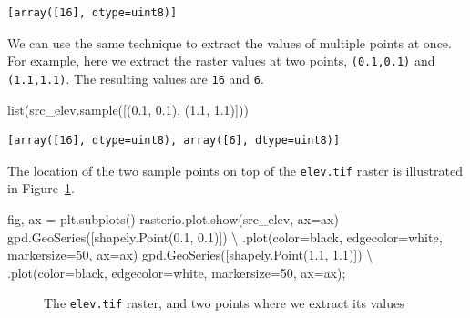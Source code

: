 \documentclass[
  letterpaper,
]{krantz}
\newenvironment{Shaded}{\begin{snugshade}}{\end{snugshade}}
\newcommand{\BuiltInTok}[1]{\textcolor[rgb]{0.00,0.23,0.31}{#1}}
\newcommand{\DecValTok}[1]{\textcolor[rgb]{0.68,0.00,0.00}{#1}}
\newcommand{\FloatTok}[1]{\textcolor[rgb]{0.68,0.00,0.00}{#1}}
\newcommand{\NormalTok}[1]{\textcolor[rgb]{0.00,0.23,0.31}{#1}}
\newcommand{\OperatorTok}[1]{\textcolor[rgb]{0.37,0.37,0.37}{#1}}
\newcommand{\StringTok}[1]{\textcolor[rgb]{0.13,0.47,0.30}{#1}}
\begin{document}
\begin{verbatim}
[array([16], dtype=uint8)]
\end{verbatim}

We can use the same technique to extract the values of multiple points
at once. For example, here we extract the raster values at two points,
\texttt{(0.1,0.1)} and \texttt{(1.1,1.1)}. The resulting values are
\texttt{16} and \texttt{6}.

\begin{Shaded}
\begin{Highlighting}[]
\BuiltInTok{list}\NormalTok{(src\_elev.sample([(}\FloatTok{0.1}\NormalTok{, }\FloatTok{0.1}\NormalTok{), (}\FloatTok{1.1}\NormalTok{, }\FloatTok{1.1}\NormalTok{)]))}
\end{Highlighting}
\end{Shaded}

\begin{verbatim}
[array([16], dtype=uint8), array([6], dtype=uint8)]
\end{verbatim}

The location of the two sample points on top of the \texttt{elev.tif}
raster is illustrated in Figure~\ref{fig-elev-sample-points}.

\begin{Shaded}
\begin{Highlighting}[]
\NormalTok{fig, ax }\OperatorTok{=}\NormalTok{ plt.subplots()}
\NormalTok{rasterio.plot.show(src\_elev, ax}\OperatorTok{=}\NormalTok{ax)}
\NormalTok{gpd.GeoSeries([shapely.Point(}\FloatTok{0.1}\NormalTok{, }\FloatTok{0.1}\NormalTok{)]) }\OperatorTok{\textbackslash{}}
\NormalTok{    .plot(color}\OperatorTok{=}\StringTok{\textquotesingle{}black\textquotesingle{}}\NormalTok{, edgecolor}\OperatorTok{=}\StringTok{\textquotesingle{}white\textquotesingle{}}\NormalTok{, markersize}\OperatorTok{=}\DecValTok{50}\NormalTok{, ax}\OperatorTok{=}\NormalTok{ax)}
\NormalTok{gpd.GeoSeries([shapely.Point(}\FloatTok{1.1}\NormalTok{, }\FloatTok{1.1}\NormalTok{)]) }\OperatorTok{\textbackslash{}}
\NormalTok{    .plot(color}\OperatorTok{=}\StringTok{\textquotesingle{}black\textquotesingle{}}\NormalTok{, edgecolor}\OperatorTok{=}\StringTok{\textquotesingle{}white\textquotesingle{}}\NormalTok{, markersize}\OperatorTok{=}\DecValTok{50}\NormalTok{, ax}\OperatorTok{=}\NormalTok{ax)}\OperatorTok{;}
\end{Highlighting}
\end{Shaded}

\begin{figure}[H]


\caption{\label{fig-elev-sample-points}The \texttt{elev.tif} raster, and
two points where we extract its values}

\end{figure}%
\end{document}
